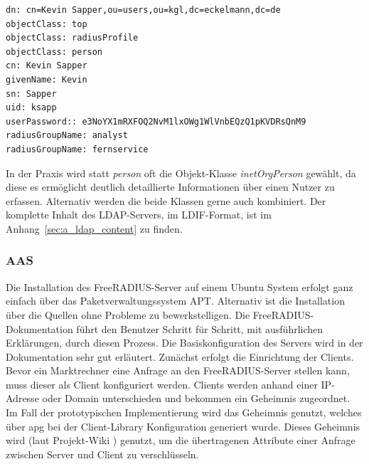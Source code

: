 \documentclass[11pt,a4paper]{report}
\begin{document}
\begin{lstlisting}[caption={Benutzerbeschreibung im LDIF-Format},label=lst:ldif_user]
dn: cn=Kevin Sapper,ou=users,ou=kgl,dc=eckelmann,dc=de
objectClass: top
objectClass: radiusProfile
objectClass: person
cn: Kevin Sapper
givenName: Kevin
sn: Sapper
uid: ksapp
userPassword:: e3NoYX1mRXFOQ2NvM1lxOWg1WlVnbEQzQ1pKVDRsQnM9
radiusGroupName: analyst
radiusGroupName: fernservice
\end{lstlisting}

In der Praxis wird statt \textit{person} oft die Objekt-Klasse \textit{inetOrgPerson} gewählt, da diese es ermöglicht deutlich detaillierte Informationen über einen Nutzer zu erfassen. Alternativ werden die beide Klassen gerne auch kombiniert. Der komplette Inhalt des LDAP-Servers, im LDIF-Format, ist im Anhang~\ref{sec:a_ldap_content} zu finden. 

\subsubsection{AAS}

Die Installation des FreeRADIUS-Server auf einem Ubuntu System erfolgt ganz einfach über das Paketverwaltungssystem APT. Alternativ ist die Installation über die Quellen ohne Probleme zu bewerkstelligen. Die FreeRADIUS-Dokumentation führt den Benutzer Schritt für Schritt, mit ausführlichen Erklärungen, durch diesen Prozess. Die Basiskonfiguration des Servers wird in der Dokumentation sehr gut erläutert. Zunächst erfolgt die Einrichtung der Clients. Bevor ein Marktrechner eine Anfrage an den FreeRADIUS-Server stellen kann, muss dieser als Client konfiguriert werden. Clients werden anhand einer IP-Adresse oder Domain unterschieden und bekommen ein Geheimnis zugeordnet. Im Fall der prototypischen Implementierung wird das Geheimnis genutzt, welches über apg bei der Client-Library Konfiguration generiert wurde. Dieses Geheimnis wird (laut Projekt-Wiki \cite{wiki_freeradius}) genutzt, um die übertragenen Attribute einer Anfrage zwischen Server und Client zu verschlüsseln.
\end{document}
